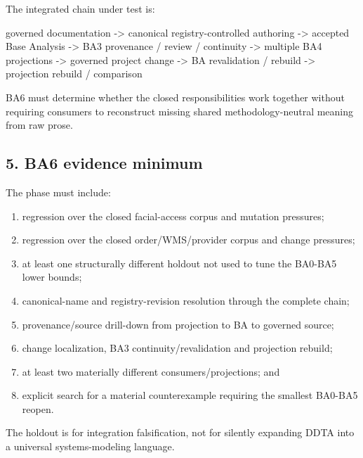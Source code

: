 \documentclass[
  10pt,
  a4paper,
]{article}
\newenvironment{Shaded}{}{}
\newcommand{\NormalTok}[1]{#1}
\providecommand{\tightlist}{%
  \setlength{\itemsep}{0pt}\setlength{\parskip}{0pt}}
\begin{document}
The integrated chain under test is:

\begin{Shaded}
\begin{Highlighting}[]
\NormalTok{governed documentation}
\NormalTok{ {-}\textgreater{} canonical registry{-}controlled authoring}
\NormalTok{ {-}\textgreater{} accepted Base Analysis}
\NormalTok{ {-}\textgreater{} BA3 provenance / review / continuity}
\NormalTok{ {-}\textgreater{} multiple BA4 projections}
\NormalTok{ {-}\textgreater{} governed project change}
\NormalTok{ {-}\textgreater{} BA revalidation / rebuild}
\NormalTok{ {-}\textgreater{} projection rebuild / comparison}
\end{Highlighting}
\end{Shaded}

BA6 must determine whether the closed responsibilities work together
without requiring consumers to reconstruct missing shared
methodology-neutral meaning from raw prose.

\subsection{5. BA6 evidence minimum}\label{5-ba6-evidence-minimum}

The phase must include:

\begin{enumerate}
\def\labelenumi{\arabic{enumi}.}
\tightlist
\item
  regression over the closed facial-access corpus and mutation
  pressures;
\item
  regression over the closed order/WMS/provider corpus and change
  pressures;
\item
  at least one structurally different holdout not used to tune the
  BA0-BA5 lower bounds;
\item
  canonical-name and registry-revision resolution through the complete
  chain;
\item
  provenance/source drill-down from projection to BA to governed source;
\item
  change localization, BA3 continuity/revalidation and projection
  rebuild;
\item
  at least two materially different consumers/projections; and
\item
  explicit search for a material counterexample requiring the smallest
  BA0-BA5 reopen.
\end{enumerate}

The holdout is for integration falsification, not for silently expanding
DDTA into a universal systems-modeling language.
\end{document}
